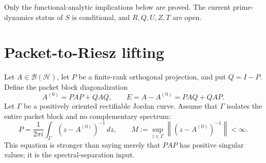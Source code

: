 \documentclass[11pt]{article}
\theoremstyle{definition}
\theoremstyle{remark}
\newcommand{\cH}{\mathcal H}
\newcommand{\norm}[1]{\left\lVert#1\right\rVert}
\begin{document}
Only the functional-analytic implications below are proved.  The current
prime-dynamics status of $S$ is conditional, and $R,Q,U,Z,T$ are open.

\section{Packet-to-Riesz lifting}

Let $A\in\mathcal B(\cH)$, let $P$ be a finite-rank orthogonal projection,
and put $Q=I-P$.  Define the packet block diagonalization
\[
 A^{(0)}=PAP+QAQ,
 \qquad E=A-A^{(0)}=PAQ+QAP.
\]
Let $\Gamma$ be a positively oriented rectifiable Jordan curve.  Assume that
$\Gamma$ isolates the entire packet block and no complementary spectrum:
\begin{equation}\label{eq:block-riesz}
 P=\frac{1}{2\pi i}\int_\Gamma(z-A^{(0)})^{-1}\,dz,
 \qquad
 M:=\sup_{z\in\Gamma}\norm{(z-A^{(0)})^{-1}}<\infty.
\end{equation}
This equation is stronger than saying merely that $PAP$ has positive
singular values; it is the spectral-separation input.
\end{document}
